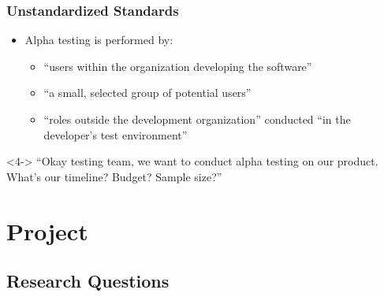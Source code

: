 \documentclass{beamer}
\newcommand{\citepISTQB}{\citepalias[\citeyear{ISTQB}]{ISTQB}}
\begin{document}
\begin{frame}
    \frametitle{Unstandardized Standards}
    \begin{itemize}
        \item Alpha testing is performed by:
              \begin{itemize}
                  \item ``users within the organization developing
                        the software'' \citep[p.~17]{IEEE2017}
                  \item<2-> ``a small, selected group of
                        potential users'' \citep[p.~5-8]{SWEBOK2024}
                  \item<3-> ``roles outside the development organization'' conducted
                        ``in the developer's test environment'' \citepISTQB{}
              \end{itemize}
    \end{itemize}

    \begin{block}<4->{}
        {``Okay testing team, we want to conduct alpha testing on our
            product. What's our timeline? Budget? Sample size?''}
    \end{block}
\end{frame}


\section{Project}
\subsection{Research Questions}

\def\rqa{\begin{alertblock}{Research Question 1}
        \rqatext{}
    \end{alertblock}
}

\def\rqb{\begin{alertblock}{Research Question 2}
        \rqbtext{}
    \end{alertblock}
}

\def\rqc{\begin{alertblock}{Research Question 3}
        \rqctext{}
    \end{alertblock}
}
\end{document}
